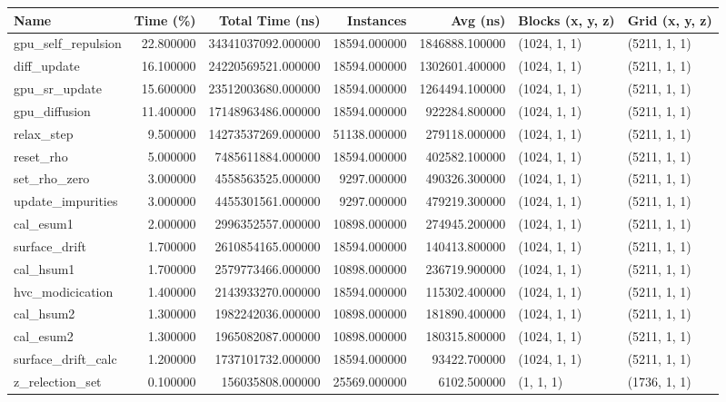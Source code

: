 \begin{tabular}{lrrrrll}
\toprule
Name & Time (\%) & Total Time (ns) & Instances & Avg (ns) & Blocks (x, y, z) & Grid (x, y, z) \\
\midrule
gpu\_self\_repulsion & 22.800000 & 34341037092.000000 & 18594.000000 & 1846888.100000 & (1024, 1, 1) & (5211, 1, 1) \\
diff\_update & 16.100000 & 24220569521.000000 & 18594.000000 & 1302601.400000 & (1024, 1, 1) & (5211, 1, 1) \\
gpu\_sr\_update & 15.600000 & 23512003680.000000 & 18594.000000 & 1264494.100000 & (1024, 1, 1) & (5211, 1, 1) \\
gpu\_diffusion & 11.400000 & 17148963486.000000 & 18594.000000 & 922284.800000 & (1024, 1, 1) & (5211, 1, 1) \\
relax\_step & 9.500000 & 14273537269.000000 & 51138.000000 & 279118.000000 & (1024, 1, 1) & (5211, 1, 1) \\
reset\_rho & 5.000000 & 7485611884.000000 & 18594.000000 & 402582.100000 & (1024, 1, 1) & (5211, 1, 1) \\
set\_rho\_zero & 3.000000 & 4558563525.000000 & 9297.000000 & 490326.300000 & (1024, 1, 1) & (5211, 1, 1) \\
update\_impurities & 3.000000 & 4455301561.000000 & 9297.000000 & 479219.300000 & (1024, 1, 1) & (5211, 1, 1) \\
cal\_esum1 & 2.000000 & 2996352557.000000 & 10898.000000 & 274945.200000 & (1024, 1, 1) & (5211, 1, 1) \\
surface\_drift & 1.700000 & 2610854165.000000 & 18594.000000 & 140413.800000 & (1024, 1, 1) & (5211, 1, 1) \\
cal\_hsum1 & 1.700000 & 2579773466.000000 & 10898.000000 & 236719.900000 & (1024, 1, 1) & (5211, 1, 1) \\
hvc\_modicication & 1.400000 & 2143933270.000000 & 18594.000000 & 115302.400000 & (1024, 1, 1) & (5211, 1, 1) \\
cal\_hsum2 & 1.300000 & 1982242036.000000 & 10898.000000 & 181890.400000 & (1024, 1, 1) & (5211, 1, 1) \\
cal\_esum2 & 1.300000 & 1965082087.000000 & 10898.000000 & 180315.800000 & (1024, 1, 1) & (5211, 1, 1) \\
surface\_drift\_calc & 1.200000 & 1737101732.000000 & 18594.000000 & 93422.700000 & (1024, 1, 1) & (5211, 1, 1) \\
z\_relection\_set & 0.100000 & 156035808.000000 & 25569.000000 & 6102.500000 & (1, 1, 1) & (1736, 1, 1) \\

\end{tabular}
